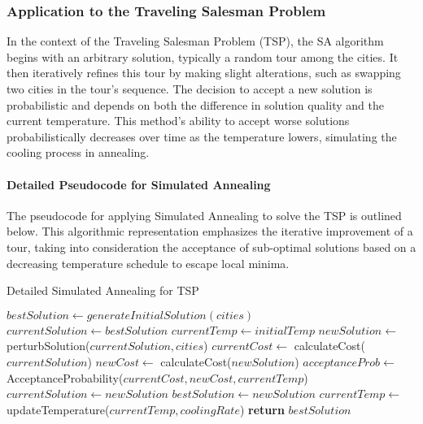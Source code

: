 \subsubsection{Application to the Traveling Salesman Problem}

In the context of the Traveling Salesman Problem (TSP), the SA algorithm begins with an arbitrary solution, typically a random tour among the cities. It then iteratively refines this tour by making slight alterations, such as swapping two cities in the tour's sequence. The decision to accept a new solution is probabilistic and depends on both the difference in solution quality and the current temperature. This method's ability to accept worse solutions probabilistically decreases over time as the temperature lowers, simulating the cooling process in annealing.

\paragraph{Detailed Pseudocode for Simulated Annealing}

The pseudocode for applying Simulated Annealing to solve the TSP is outlined below. This algorithmic representation emphasizes the iterative improvement of a tour, taking into consideration the acceptance of sub-optimal solutions based on a decreasing temperature schedule to escape local minima.

\begin{algorithm}
	\caption{Detailed Simulated Annealing for TSP}\label{alg:detailedsimulatedannealing}
	\begin{algorithmic}[1]
		\State $bestSolution \gets generateInitialSolution(cities)$
		\State $currentSolution \gets bestSolution$
		\State $currentTemp \gets initialTemp$
		\State $newSolution \gets$ perturbSolution($currentSolution, cities$)
		\State $currentCost \gets$ calculateCost($currentSolution$)
		\State $newCost \gets$ calculateCost($newSolution$)
		\State $acceptanceProb \gets$ AcceptanceProbability($currentCost, newCost, currentTemp$)
		\State $currentSolution \gets newSolution$
		\State $bestSolution \gets newSolution$
		\EndIf
		\EndIf
		\State $currentTemp \gets$ updateTemperature($currentTemp, coolingRate$)
		\EndWhile
		\State \textbf{return} $bestSolution$
		\EndProcedure
	\end{algorithmic}
\end{algorithm}

